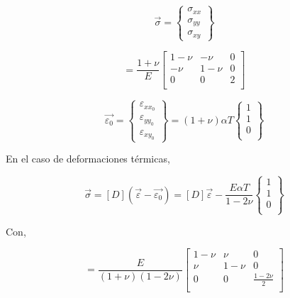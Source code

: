 \begin{equation}
\vec{\sigma} = 
\left\{\begin{matrix}
\sigma_{xx} \\ \sigma_{yy} \\ \sigma_{xy}
\end{matrix}\right\}
\end{equation}

\begin{equation}
[C] = \frac{1+\nu}{E}
\left[\begin{matrix}
1-\nu & -\nu & 0 \\
-\nu & 1-\nu & 0 \\
0 & 0 & 2 \\
\end{matrix}\right]
\end{equation}

\begin{equation}
\vec{\varepsilon_0} = 
\left\{\begin{matrix}
\varepsilon_{xx_0} \\ \varepsilon_{yy_0} \\ \varepsilon_{xy_0}
\end{matrix}\right\} =
(1+\nu) \alpha T 
\left\{\begin{matrix}
1 \\ 1 \\ 0 \\
\end{matrix}\right\}
\end{equation}

En el caso de deformaciones térmicas,

\begin{equation}
\vec{\sigma} = [D] (\vec{\varepsilon} - \vec{\varepsilon_0}) = 
[D] \vec{\varepsilon} - 
\frac{E\alpha T}{1-2\nu} 
\left\{\begin{matrix}
1 \\ 1 \\ 0 \\
\end{matrix}\right\}
\end{equation}

Con, 

\begin{equation}
[D] = \frac{E}{(1+\nu)(1-2\nu)}
\left[\begin{matrix}
1-\nu & \nu & 0 \\
\nu & 1-\nu & 0 \\
0 & 0 & \frac{1-2\nu}{2} \\
\end{matrix}\right]
\end{equation}

